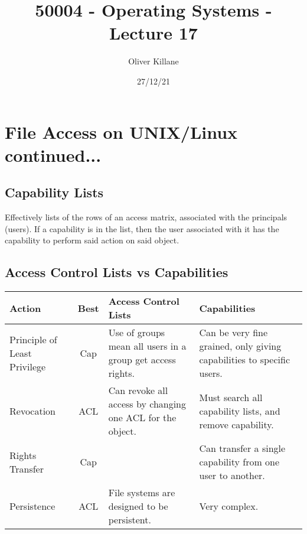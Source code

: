 \documentclass{report}
\title{50004 - Operating Systems - Lecture 17}
\author{Oliver Killane}
\date{27/12/21}
\begin{document}
    \maketitle

    \section*{File Access on UNIX/Linux continued...}
        \subsection*{Capability Lists}
            Effectively lists of the rows of an access matrix, associated with the principals (users). If a capability is in the list, then the user associated with it has the capability to perform said action on said object.
        \subsection*{Access Control Lists vs Capabilities}
            \begin{center}
                \begin{tabular}{p{} c p{} p{}}
                    \textbf{Action} & \textbf{Best} & \textbf{Access Control Lists} & \textbf{Capabilities} \\
                    \hline
                    Principle of Least Privilege & Cap & Use of groups mean all users in a group get access rights. & Can be very fine grained, only giving capabilities to specific users.\\
                    \hline
                    Revocation & ACL & Can revoke all access by changing one ACL for the object. & Must search all capability lists, and remove capability.  \\
                    \hline
                    Rights Transfer & Cap & & Can transfer a single capability from one user to another. \\
                    \hline
                    Persistence & ACL & File systems are designed to be persistent. & Very complex. \\
                    
                \end{tabular}
            \end{center}
\end{document}
